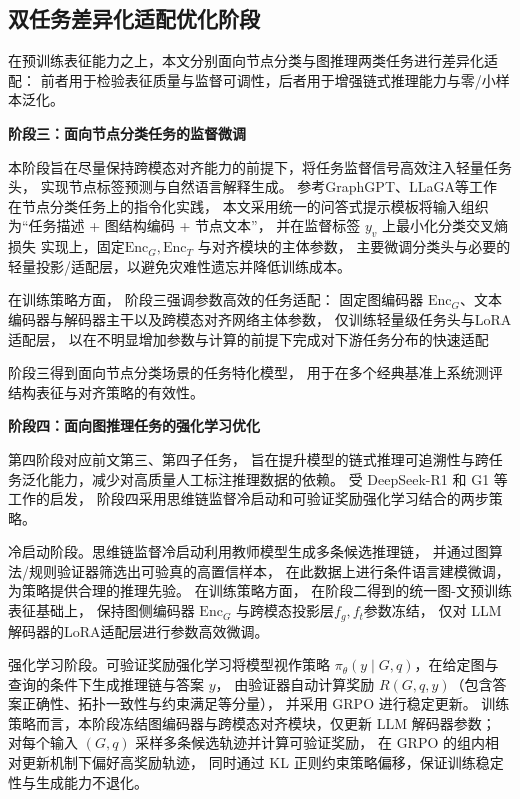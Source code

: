\subsection{双任务差异化适配优化阶段}

在预训练表征能力之上，本文分别面向节点分类与图推理两类任务进行差异化适配：
前者用于检验表征质量与监督可调性，后者用于增强链式推理能力与零/小样本泛化。

\textbf{阶段三：面向节点分类任务的监督微调}

本阶段旨在尽量保持跨模态对齐能力的前提下，将任务监督信号高效注入轻量任务头，
实现节点标签预测与自然语言解释生成。
参考GraphGPT\cite{Tang2023GraphGPTGI}、LLaGA\cite{Chen2024LLaGALL}等工作
在节点分类任务上的指令化实践，
本文采用统一的问答式提示模板将输入组织为“任务描述 + 图结构编码 + 节点文本”，
并在监督标签 $y_v$ 上最小化分类交叉熵损失
实现上，固定$\mathrm{Enc}_G,\mathrm{Enc}_T$ 与对齐模块的主体参数，
主要微调分类头与必要的轻量投影/适配层，以避免灾难性遗忘并降低训练成本。

在训练策略方面，
阶段三强调参数高效的任务适配：
固定图编码器 $\mathrm{Enc}_G$、文本编码器与解码器主干以及跨模态对齐网络主体参数，
仅训练轻量级任务头与LoRA适配层，
以在不明显增加参数与计算的前提下完成对下游任务分布的快速适配

阶段三得到面向节点分类场景的任务特化模型，
用于在多个经典基准上系统测评结构表征与对齐策略的有效性。

\textbf{阶段四：面向图推理任务的强化学习优化}

第四阶段对应前文第三、第四子任务，
旨在提升模型的链式推理可追溯性与跨任务泛化能力，减少对高质量人工标注推理数据的依赖。
受 DeepSeek-R1 \cite{DeepSeekAI2025DeepSeekR1IR} 和 G1 \cite{Guo2025G1TL}等工作的启发，
阶段四采用思维链监督冷启动和可验证奖励强化学习结合的两步策略。

冷启动阶段。思维链监督冷启动利用教师模型生成多条候选推理链，
并通过图算法/规则验证器筛选出可验真的高置信样本，
在此数据上进行条件语言建模微调，为策略提供合理的推理先验。
在训练策略方面，
在阶段二得到的统一图-文预训练表征基础上，
保持图侧编码器 $\mathrm{Enc}_G$ 与跨模态投影层$f_g,f_t$参数冻结，
仅对 LLM 解码器的LoRA适配层进行参数高效微调。



强化学习阶段。可验证奖励强化学习将模型视作策略 $\pi_{\theta}(y\mid G,q)$，在给定图与查询的条件下生成推理链与答案 $y$，
由验证器自动计算奖励 $R(G,q,y)$（包含答案正确性、拓扑一致性与约束满足等分量），
并采用 GRPO 进行稳定更新。
训练策略而言，本阶段冻结图编码器与跨模态对齐模块，仅更新 LLM 解码器参数；
对每个输入 $(G,q)$ 采样多条候选轨迹并计算可验证奖励，
在 GRPO 的组内相对更新机制下偏好高奖励轨迹，
同时通过 KL 正则约束策略偏移，保证训练稳定性与生成能力不退化。

